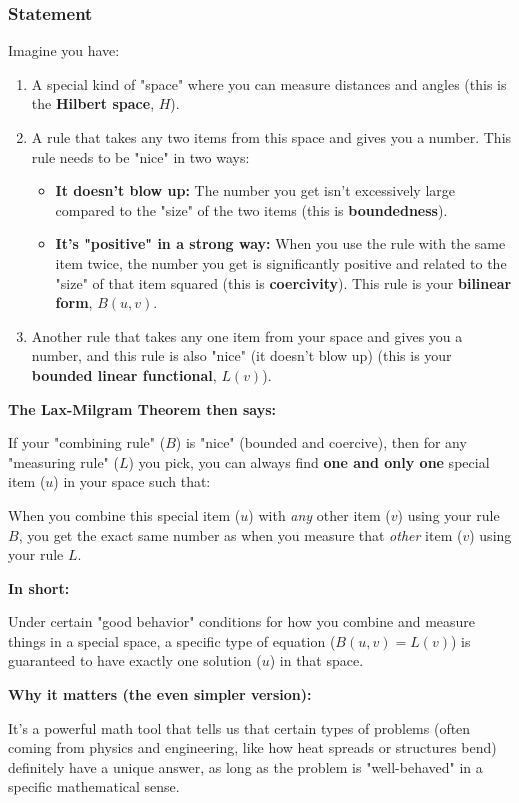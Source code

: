 \subsubsection{Statement}

Imagine you have:

\begin{enumerate}
	\item A special kind of "space" where you can measure distances and angles (this is the \textbf{Hilbert space}, $H$).
	\item A rule that takes any two items from this space and gives you a number. This rule needs to be "nice" in two ways:
	\begin{itemize}
		\item \textbf{It doesn't blow up:} The number you get isn't excessively large compared to the "size" of the two items (this is \textbf{boundedness}).
		\item \textbf{It's "positive" in a strong way:} When you use the rule with the same item twice, the number you get is significantly positive and related to the "size" of that item squared (this is \textbf{coercivity}). This rule is your \textbf{bilinear form}, $B(u,v)$.
	\end{itemize}
	\item Another rule that takes any one item from your space and gives you a number, and this rule is also "nice" (it doesn't blow up) (this is your \textbf{bounded linear functional}, $L(v)$).
\end{enumerate}

\textbf{The Lax-Milgram Theorem then says:}

If your "combining rule" ($B$) is "nice" (bounded and coercive), then for any "measuring rule" ($L$) you pick, you can always find \textbf{one and only one} special item ($u$) in your space such that:

When you combine this special item ($u$) with \textit{any} other item ($v$) using your rule $B$, you get the exact same number as when you measure that \textit{other} item ($v$) using your rule $L$.

\textbf{In short:}

Under certain "good behavior" conditions for how you combine and measure things in a special space, a specific type of equation ($B(u,v)=L(v)$) is guaranteed to have exactly one solution ($u$) in that space.

\textbf{Why it matters (the even simpler version):}

It's a powerful math tool that tells us that certain types of problems (often coming from physics and engineering, like how heat spreads or structures bend) definitely have a unique answer, as long as the problem is "well-behaved" in a specific mathematical sense.

